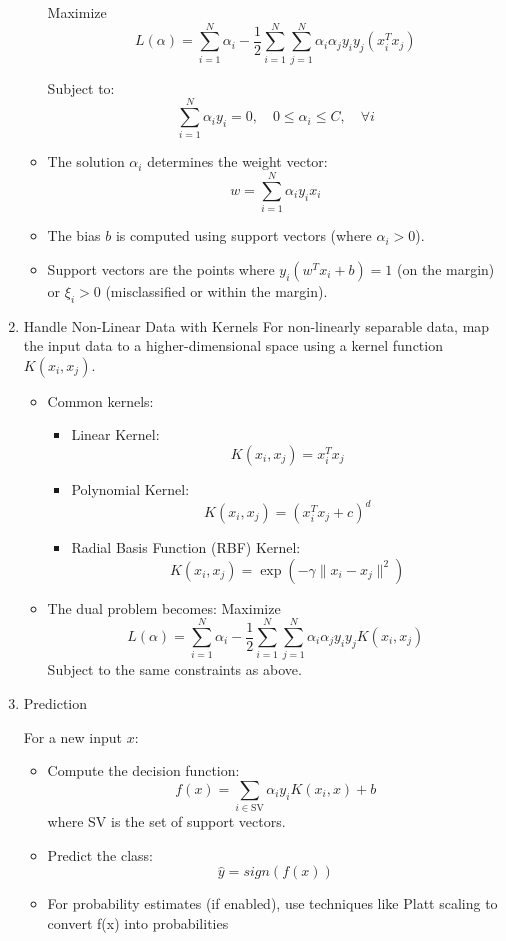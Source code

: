 \begin{enumerate}[label=Step \arabic*:, align=left, leftmargin=20pt,labelsep=1em]
\begin{itemize}
        Maximize
        \[L(\alpha) = \sum_{i=1}^N \alpha_i - \frac{1}{2} \sum_{i=1}^N \sum_{j=1}^N \alpha_i \alpha_j y_i y_j (x_i^T x_j)\]

        Subject to:
        \[\sum_{i=1}^N \alpha_i y_i = 0, \quad 0 \leq \alpha_i \leq C, \quad \forall i\]

        \item The solution $\alpha_i$ determines the weight vector:
        \[w = \sum_{i=1}^N \alpha_i y_i x_i\]
        \item The bias $b$ is computed using support vectors (where $\alpha_i > 0$).
        \item Support vectors are the points where $y_i(w^T x_i + b) = 1$ (on the margin) or $\xi_i > 0$ (misclassified or within the margin).
    \end{itemize}

    \item Handle Non-Linear Data with Kernels
    For non-linearly separable data, map the input data to a higher-dimensional space using a kernel function $K(x_i, x_j)$.
    \begin{itemize}
        \item Common kernels:
        \begin{itemize}
            \item Linear Kernel:
            \[K(x_i, x_j) = x_i^T x_j\]
            \item Polynomial Kernel:
            \[K(x_i, x_j) = (x_i^T x_j + c)^d\]
            \item Radial Basis Function (RBF) Kernel:
            \[K(x_i, x_j) = \exp(-\gamma \|x_i - x_j\|^2)\]
        \end{itemize}

        \item The dual problem becomes: Maximize
        \[L(\alpha) = \sum_{i=1}^N \alpha_i - \frac{1}{2} \sum_{i=1}^N \sum_{j=1}^N \alpha_i \alpha_j y_i y_j K(x_i, x_j)\]
        Subject to the same constraints as above.
    \end{itemize}

    \item Prediction

    For a new input $x$:
    \begin{itemize}
        \item Compute the decision function:
        \[f(x) = \sum_{i \in \text{SV}} \alpha_i y_i K(x_i, x) + b\]
        where SV is the set of support vectors.
        \smallskip
        \item Predict the class:
        \[\hat{y} = sign(f(x))\]
        \item For probability estimates (if enabled), use techniques like Platt scaling to convert f(x) into probabilities
    \end{itemize}
\end{enumerate}

